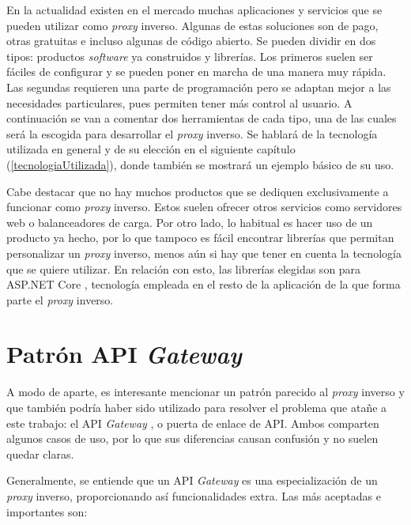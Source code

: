 \documentclass[11pt,spanish,listoffigures]{tfgetsinf}
\begin{document}
En la actualidad existen en el mercado muchas aplicaciones y servicios que se pueden utilizar como \emph{proxy} inverso. Algunas de estas soluciones son de pago, otras gratuitas e incluso algunas de código abierto. Se pueden dividir en dos tipos: productos \emph{software} ya construidos y librerías. Los primeros suelen ser fáciles de configurar y se pueden poner en marcha de una manera muy rápida. Las segundas requieren una parte de programación pero se adaptan mejor a las necesidades particulares, pues permiten tener más control al usuario. A continuación se van a comentar dos herramientas de cada tipo, una de las cuales será la escogida para desarrollar el \emph{proxy} inverso. Se hablará de la tecnología utilizada en general y de su elección en el siguiente capítulo (\ref{tecnologiaUtilizada}), donde también se mostrará un ejemplo básico de su uso.

Cabe destacar que no hay muchos productos que se dediquen exclusivamente a funcionar como \emph{proxy} inverso. Estos suelen ofrecer otros servicios como servidores web o balanceadores de carga. Por otro lado, lo habitual es hacer uso de un producto ya hecho, por lo que tampoco es fácil encontrar librerías que permitan personalizar un \emph{proxy} inverso, menos aún si hay que tener en cuenta la tecnología que se quiere utilizar. En relación con esto, las librerías elegidas son para ASP.NET Core \cite{DotNetCore}, tecnología empleada en el resto de la aplicación de la que forma parte el \emph{proxy} inverso.


	\section{Patrón API \emph{Gateway}}

A modo de aparte, es interesante mencionar un patrón parecido al \emph{proxy} inverso y que también podría haber sido utilizado para resolver el problema que atañe a este trabajo: el API \emph{Gateway} \cite{ApiGateway}, o puerta de enlace de API. Ambos comparten algunos casos de uso, por lo que sus diferencias causan confusión y no suelen quedar claras.

Generalmente, se entiende que un API \emph{Gateway} es una especialización de un \emph{proxy} inverso, proporcionando así funcionalidades extra. Las más aceptadas e importantes son:
\end{document}
